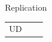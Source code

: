 \documentclass[final]{beamer}
\begin{document}
\begin{frame}{}
\begin{textblock}{67}
\begin{block}{Replication}
\begin{tabular}{c c c}
UD
\end{tabular}
\end{block}
\end{textblock}
\end{frame}
\end{document}
